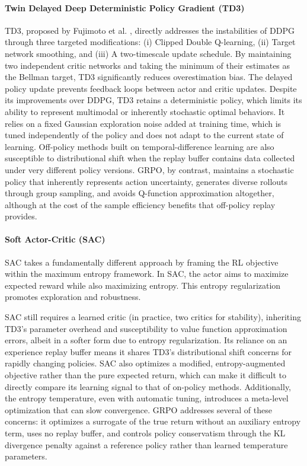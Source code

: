 \documentclass{article}
\begin{document}
\paragraph{Twin Delayed Deep Deterministic Policy Gradient (TD3)}
TD3, proposed by Fujimoto et al. \cite{fujimoto2018addressing}, directly addresses the instabilities of DDPG through three targeted modifications: (i) Clipped Double Q-learning, (ii) Target network smoothing, and (iii) A two-timescale update schedule. By maintaining two independent critic networks and taking the minimum of their estimates as the Bellman target, TD3 significantly reduces overestimation bias. The delayed policy update prevents feedback loops between actor and critic updates.
Despite its improvements over DDPG, TD3 retains a deterministic policy, which limits its ability to represent multimodal or inherently stochastic optimal behaviors. It relies on a fixed Gaussian exploration noise added at training time, which is tuned independently of the policy and does not adapt to the current state of learning. Off-policy methods built on temporal-difference learning are also susceptible to distributional shift when the replay buffer contains data collected under very different policy versions. GRPO, by contrast, maintains a stochastic policy that inherently represents action uncertainty, generates diverse rollouts through group sampling, and avoids Q-function approximation altogether, although at the cost of the sample efficiency benefits that off-policy replay provides.

\paragraph{Soft Actor-Critic (SAC)}
SAC \cite{haarnoja2018soft} takes a fundamentally different approach by framing the RL objective within the maximum entropy framework. In SAC, the actor aims to maximize expected reward while also maximizing entropy. This entropy regularization promotes exploration and robustness. \cite{haarnoja2018softApplications}

SAC still requires a learned critic (in practice, two critics for stability), inheriting TD3's parameter overhead and susceptibility to value function approximation errors, albeit in a softer form due to entropy regularization. Its reliance on an experience replay buffer means it shares TD3's distributional shift concerns for rapidly changing policies. SAC also optimizes a modified, entropy-augmented objective rather than the pure expected return, which can make it difficult to directly compare its learning signal to that of on-policy methods. Additionally, the entropy temperature, even with automatic tuning, introduces a meta-level optimization that can slow convergence. GRPO addresses several of these concerns: it optimizes a surrogate of the true return without an auxiliary entropy term, uses no replay buffer, and controls policy conservatism through the KL divergence penalty against a reference policy rather than learned temperature parameters.
\end{document}
